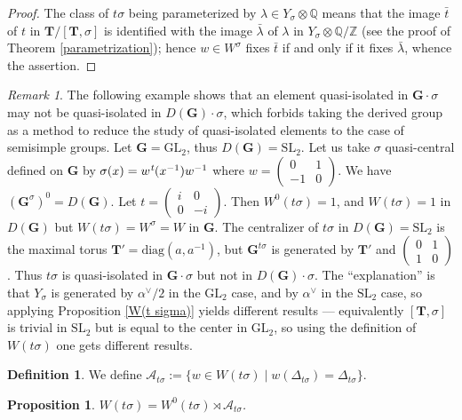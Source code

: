 \documentclass{amsart}
\newtheorem{proposition}[equation]{Proposition}
\numberwithin{equation}{section}
\theoremstyle{definition}
\newtheorem{definition}[equation]{Definition}
\theoremstyle{remark}
\newtheorem{remark}[equation]{Remark}
\newcommand\bG{{\mathbf G}}
\newcommand\bT{{\mathbf T}}
\newcommand\BQ{{\mathbb Q}}
\newcommand\BZ{{\mathbb Z}}
\newcommand\CA{{\mathcal A}}
\newcommand\Gts{{\bG^{t\sigma}}}
\newcommand\Gs{{\bG^\sigma}}
\newcommand\Gso{{(\Gs)^0}}
\newcommand\LT{{\bT/[\bT,\sigma]}}
\newcommand\lexp[2]{\kern\scriptspace\vphantom{#2}^{#1}\kern-\scriptspace#2}
\newcommand\inv{^{-1}}
\newcommand\GL{\mathrm{GL}}
\newcommand\SL{\mathrm{SL}}
\newcommand\diag{\mathrm{diag}}
\begin{document}
\begin{proof} The class of $t\sigma$ being parameterized by 
$\lambda\in Y_\sigma\otimes\BQ$ means that the image $\bar t$ of $t$
in $\LT$ is identified with the image $\bar\lambda$ of $\lambda$ in 
$Y_\sigma\otimes\BQ/\BZ$
(see the proof of Theorem \ref{parametrization}); hence $w\in W^\sigma$ fixes 
$\bar t$
if and only if it fixes $\bar \lambda$, whence the assertion.
\end{proof}
\begin{remark}
The  following example shows that an element quasi-isolated in $\bG\cdot\sigma$
may not be quasi-isolated in $D(\bG)\cdot\sigma$, which forbids taking
the derived group as a method to reduce the study of quasi-isolated elements
to the case of semisimple groups. Let $\bG=\GL_2$, thus
$D(\bG)=\SL_2$.  Let  us  take  $\sigma$ quasi-central defined on
$\bG$ by $\sigma(x)=w\lexp t(x\inv)w\inv$ where $w=\begin{pmatrix}0&1\\-1&0
\end{pmatrix}$. We have $\Gso=D(\bG)$. Let
$t=\begin{pmatrix}i&0\\0&-i\end{pmatrix}$.   Then   $W^0(t\sigma)=1$,   and
$W(t\sigma)=1$    in    $D(\bG)$    but    $W(t\sigma)=W^\sigma=W$
in  $\bG$.  The  centralizer of $t\sigma$ in
$D(\bG)=\SL_2$    is   the   maximal torus $\bT'=\diag(a,a\inv)$, 
but   $\Gts$   is   generated   by   $\bT'$   and
$\begin{pmatrix}0&1\\1&0\end{pmatrix}$. Thus $t\sigma$ is quasi-isolated in
$\bG\cdot\sigma$ but not in $D(\bG)\cdot\sigma$. The ``explanation'' is that $Y_\sigma$ is generated
by $\alpha^\vee/2$ in the $\GL_2$ case, and by $\alpha^\vee$ in the
$\SL_2$ case, so applying Proposition \ref{W(t sigma)} yields different results
--- equivalently $[\bT,\sigma]$ is trivial in $\SL_2$ but is equal to the center in $\GL_2$,
so using the definition of $W(t\sigma)$ one gets different results.
\end{remark}
\begin{definition}
We define $\CA_{t\sigma}:=\{w\in W(t\sigma)\mid
w(\Delta_{t\sigma})=\Delta_{t\sigma}\}$.
\index{Ats@$\CA_{t\sigma}$}
\end{definition}
\begin{proposition}\label{W/W0}
$W(t\sigma)=W^0(t\sigma)\rtimes\CA_{t\sigma}$.
\end{proposition}
\end{document}
